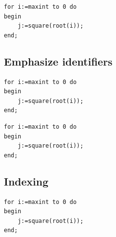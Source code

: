 \documentclass{article}
\begin{document}
{
\begin{lstlisting}[frame=single,
                      framerule=0pt]
for i:=maxint to 0 do
begin
    j:=square(root(i));
end;
\end{lstlisting}}

\subsection{Emphasize identifiers}

{
\begin{lstlisting}
for i:=maxint to 0 do
begin
    j:=square(root(i));
end;
\end{lstlisting}}

{
\begin{lstlisting}
for i:=maxint to 0 do
begin
    j:=square(root(i));
end;
\end{lstlisting}}

\subsection{Indexing}

{
\begin{lstlisting}
for i:=maxint to 0 do
begin
    j:=square(root(i));
end;
\end{lstlisting}}
\end{document}
